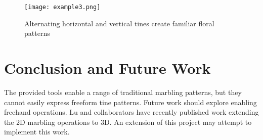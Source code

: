 \documentclass{article}
\begin{document}
\begin{figure}
    \texttt{[image: example3.png]}
    \caption{Alternating horizontal and vertical tines create familiar floral patterns}
\end{figure}

\section{Conclusion and Future Work}

The provided tools enable a range of traditional marbling patterns, but they cannot easily express freeform tine patterns. Future work should explore enabling freehand operations. Lu and collaborators have recently published work extending the 2D marbling operations to 3D. An extension of this project may attempt to implement this work. 



\end{document}
